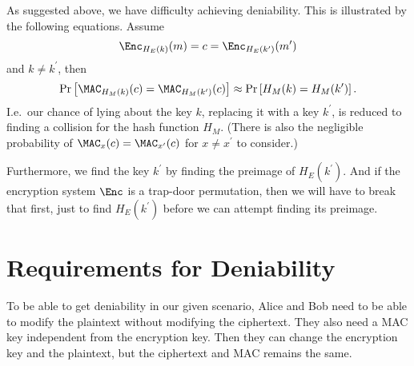 As suggested above, we have difficulty achieving deniability.
This is illustrated by the following equations.
Assume
\begin{equation*}
  \Enc_{H_E(k)}( m ) = c = \Enc_{H_E(k^\prime)}( m^\prime )
\end{equation*}
and \(k\neq k^\prime\), then
\begin{equation*}
  \Pr\left[
    \MAC_{H_M(k)}( c ) = \MAC_{H_M(k^\prime)}( c )
  \right]
  \approx
  \Pr\left[ H_M(k) = H_M(k^\prime) \right].
\end{equation*}
I.e.~our chance of lying about the key \(k\), replacing it with a key 
\(k^\prime\), is reduced to finding a collision for the hash function \(H_M\).
(There is also the negligible probability of \(\MAC_x(c) = \MAC_{x^\prime}(c)\) 
for \(x\neq x^\prime\) to consider.)

Furthermore, we find the key \(k^\prime\) by finding the preimage of \(H_E( 
k^\prime )\).
And if the encryption system \(\Enc\) is a trap-door permutation, then we will 
have to break that first, just to find \(H_E( k^\prime )\) before we can 
attempt finding its preimage.


\section{Requirements for Deniability}
\label{sec:deniability}

To be able to get deniability in our given scenario, Alice and Bob need to be 
able to modify the plaintext without modifying the ciphertext.
They also need a \ac{MAC} key independent from the encryption key.
Then they can change the encryption key and the plaintext, but the ciphertext 
and \ac{MAC} remains the same.

